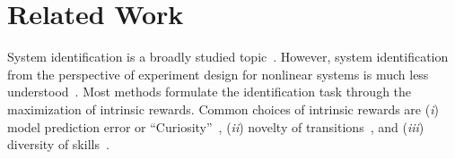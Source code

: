 \section{Related Work} \label{sec:related_works}
System identification is a broadly studied topic~\citep {ASTROMSystemID, schoukens, SCHON201139, ziemann2022single, ziemann2022learning}. However, system identification from the perspective of experiment design for nonlinear systems is much less understood~\citep{chiuso2019system}. Most methods formulate the identification task through the maximization of intrinsic rewards.
Common choices of intrinsic rewards are (\emph{i}) model prediction error or ``Curiosity''~\citep{schmidhuber1991possibility, pathak2017curiosity}, (\emph{ii}) novelty of transitions~\citep{stadie2015incentivizing}, and  (\emph{iii}) diversity of skills~\citep{eysenbach2018diversity}.


